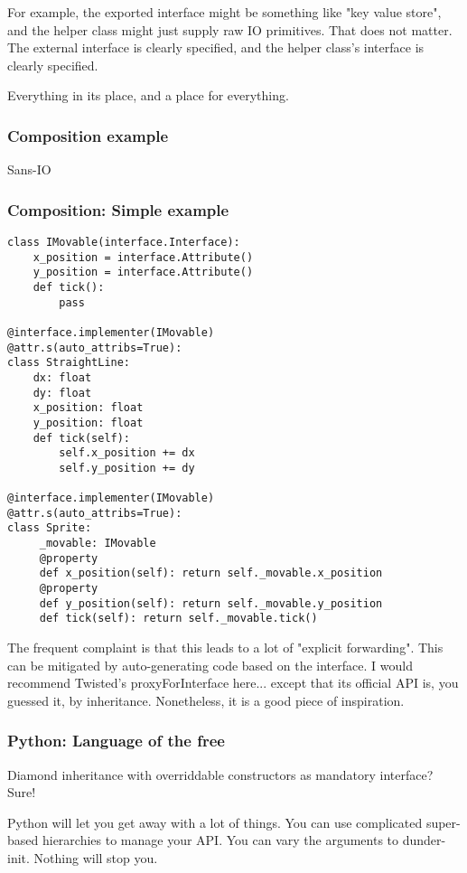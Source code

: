 For example,
the exported interface might be something like
"key value store",
and the helper class might just supply raw IO primitives.
That does not matter.
The external interface is clearly specified,
and the helper class's interface is clearly specified.

Everything in its place,
and a place for everything.

\begin{frame}[fragile]
\frametitle{Composition example}
Sans-IO
\end{frame}

\begin{frame}[fragile]
\frametitle{Composition: Simple example}
\begin{lstlisting}
class IMovable(interface.Interface):
    x_position = interface.Attribute()
    y_position = interface.Attribute()
    def tick():
        pass

@interface.implementer(IMovable)
@attr.s(auto_attribs=True):
class StraightLine:
    dx: float
    dy: float
    x_position: float
    y_position: float
    def tick(self):
        self.x_position += dx
        self.y_position += dy

@interface.implementer(IMovable)
@attr.s(auto_attribs=True):
class Sprite:
     _movable: IMovable
     @property
     def x_position(self): return self._movable.x_position
     @property
     def y_position(self): return self._movable.y_position
     def tick(self): return self._movable.tick()
\end{lstlisting}

\end{frame}

The frequent complaint is that this leads to a lot of
"explicit forwarding".
This can be mitigated by auto-generating code based on the interface.
I would recommend Twisted's proxyForInterface here...
except that its official API is,
you guessed it,
by inheritance.
Nonetheless,
it is a good piece of inspiration.

\begin{frame}[fragile]
\frametitle{Python: Language of the free}

Diamond inheritance with overriddable constructors as mandatory interface?
Sure!
\end{frame}

Python will let you get away with a lot of things.
You can use complicated super-based hierarchies to manage
your API.
You can vary the arguments to dunder-init.
Nothing will stop you.

